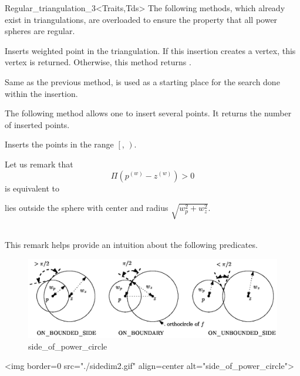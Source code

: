 \begin{ccClassTemplate}{Regular_triangulation_3<Traits,Tds>}
The following methods, which already exist in triangulations, are
overloaded to ensure the property that all power spheres are regular.

{Inserts weighted point  in the triangulation. If this
insertion creates a vertex, this vertex is returned. Otherwise, this
method returns .}

{Same as the previous method,  is used as a starting
place for the search done within the insertion.}

The following method allows one to insert several points. It returns the
number of inserted points. 

{Inserts the points in the range $\left[\right.$,
$\left.\right)$. 
}


Let us remark that 
\[\Pi({p}^{(w)}-{z}^{(w)}) > 0\]
is equivalent to\\
\centerline{ lies outside the sphere with center  and radius
$\sqrt{w_p^2+w_z^2}$.}\\
This remark helps provide an intuition about the following predicates.

\begin{ccTexOnly}
\begin{figure}[htbp]
\begin{center} 
\includegraphics{sidedim2.eps} 
\end{center}
\caption{side\_of\_power\_circle \label{Triangulation3-fig-sidedim2}}
\end{figure} 
\end{ccTexOnly}

\begin{ccHtmlOnly}
<img border=0 src="./sidedim2.gif" align=center
alt="side\_of\_power\_circle"> 
\end{ccHtmlOnly}


\end{ccClassTemplate}
